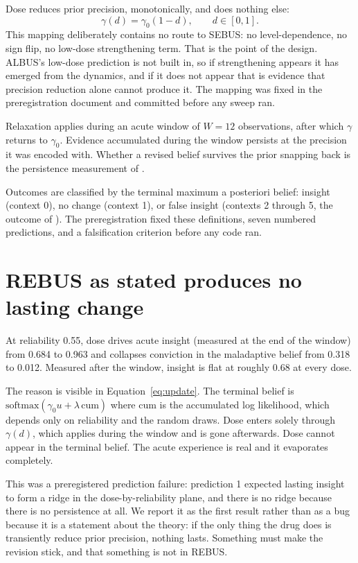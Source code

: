 \documentclass[11pt]{article}
\begin{document}
Dose reduces prior precision, monotonically, and does nothing else:
\begin{equation}
\gamma(d) = \gamma_0 (1 - d), \qquad d \in [0, 1].
\label{eq:dose}
\end{equation}
This mapping deliberately contains no route to SEBUS: no level-dependence, no sign
flip, no low-dose strengthening term. That is the point of the design. ALBUS's
low-dose prediction is not built in, so if strengthening appears it has emerged from
the dynamics, and if it does not appear that is evidence that precision reduction
alone cannot produce it. The mapping was fixed in the preregistration document and
committed before any sweep ran.

Relaxation applies during an acute window of $W = 12$ observations, after which
$\gamma$ returns to $\gamma_0$. Evidence accumulated during the window persists at
the precision it was encoded with. Whether a revised belief survives the prior
snapping back is the persistence measurement of \cite{zeifman2025}.

Outcomes are classified by the terminal maximum a posteriori belief: insight
(context 0), no change (context 1), or false insight (contexts 2 through 5, the
outcome of \cite{mcgovern2024}). The preregistration fixed these definitions, seven
numbered predictions, and a falsification criterion before any code ran.

\section{REBUS as stated produces no lasting change}
\label{sec:passive}

At reliability 0.55, dose drives acute insight (measured at the end of the window)
from 0.684 to 0.963 and collapses conviction in the maladaptive belief from 0.318 to
0.012. Measured after the window, insight is flat at roughly 0.68 at every dose.

The reason is visible in Equation~\ref{eq:update}. The terminal belief is
$\mathrm{softmax}(\gamma_0 u + \lambda \, \mathrm{cum})$ where $\mathrm{cum}$ is the
accumulated log likelihood, which depends only on reliability and the random draws.
Dose enters solely through $\gamma(d)$, which applies during the window and is gone
afterwards. Dose cannot appear in the terminal belief. The acute experience is real
and it evaporates completely.

This was a preregistered prediction failure: prediction 1 expected lasting insight to
form a ridge in the dose-by-reliability plane, and there is no ridge because there is
no persistence at all. We report it as the first result rather than as a bug because
it is a statement about the theory: if the only thing the drug does is transiently
reduce prior precision, nothing lasts. Something must make the revision stick, and
that something is not in REBUS.
\end{document}
